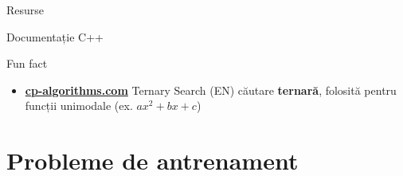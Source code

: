 ﻿\documentclass{beamer}
\begin{document}
\begin{frame}{Resurse}
\begin{block}{Documentație C++}
\begin{itemize}
    \end{itemize}
  \end{block}
  \vspace{-6pt}
  \begin{block}{Fun fact}
    \begin{itemize}\footnotesize\itemsep0pt
      \item \href{https://cp-algorithms.com/num_methods/ternary_search.html}{\textbf{cp-algorithms.com}} \textemdash{} Ternary Search (EN) \textemdash{} căutare \textbf{ternară}, folosită pentru funcții unimodale (ex. $ax^2+bx+c$)
    \end{itemize}
  \end{block}
\end{frame}

\section{Probleme de antrenament}
\end{document}
